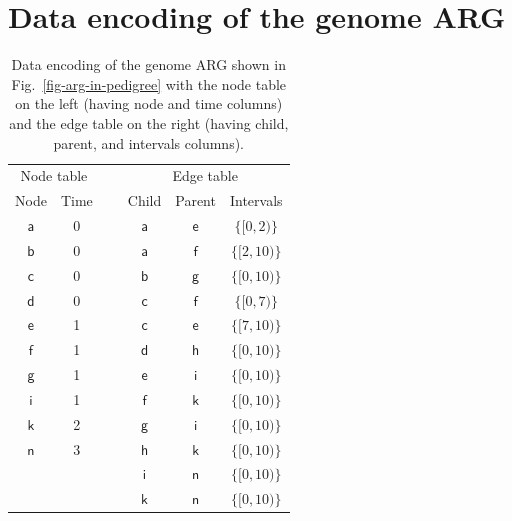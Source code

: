 \documentclass{article}
\newcommand{\noderef}[1]{\textsf{#1}}
\begin{document}

\clearpage
\section{Data encoding of the genome ARG}
\label{sec-gARG-data}

\begin{table}[ht]
    \caption{\label{tab-gARG-data}
    Data encoding of the genome ARG shown in Fig.~\ref{fig-arg-in-pedigree} with the
	node table on the left (having node and time columns) and the edge table on the
	right (having child, parent, and intervals columns).
    }
    \begin{center}
        \begin{tabular}{c|ccc|c|c}
			\multicolumn{2}{c}{Node table}& ~ &\multicolumn{3}{c}{Edge table}\\
			\cline{1-2} \cline{4-6}
            Node & Time & ~ & Child & Parent & Intervals\\
            \cline{1-2} \cline{4-6}
            $\noderef{a}$ & 0 & ~ & $\noderef{a}$ & $\noderef{e}$ & $\{[0,2)\}$\\
            $\noderef{b}$ & 0 & ~ & $\noderef{a}$ & $\noderef{f}$ & $\{[2,10)\}$\\
            $\noderef{c}$ & 0 & ~ & $\noderef{b}$ & $\noderef{g}$ & $\{[0,10)\}$\\
            $\noderef{d}$ & 0 & ~ & $\noderef{c}$ & $\noderef{f}$ & $\{[0,7)\}$\\
            $\noderef{e}$ & 1 & ~ & $\noderef{c}$ & $\noderef{e}$ & $\{[7,10)\}$\\
            $\noderef{f}$ & 1 & ~ & $\noderef{d}$ & $\noderef{h}$ & $\{[0,10)\}$\\
            $\noderef{g}$ & 1 & ~ & $\noderef{e}$ & $\noderef{i}$ & $\{[0,10)\}$\\
            $\noderef{i}$ & 1 & ~ & $\noderef{f}$ & $\noderef{k}$ & $\{[0,10)\}$\\
            $\noderef{k}$ & 2 & ~ & $\noderef{g}$ & $\noderef{i}$ & $\{[0,10)\}$\\
            $\noderef{n}$ & 3 & ~ & $\noderef{h}$ & $\noderef{k}$ & $\{[0,10)\}$\\
            \multicolumn{2}{c}{~}& ~ & $\noderef{i}$ & $\noderef{n}$ & $\{[0,10)\}$\\ 
            \multicolumn{2}{c}{~}& ~ & $\noderef{k}$ & $\noderef{n}$ & $\{[0,10)\}$
        \end{tabular}
    \end{center}
\end{table}
\end{document}
